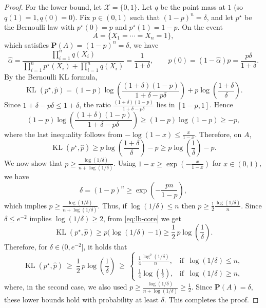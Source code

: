 \documentclass[10pt,a4paper]{amsart}
\renewcommand{\P}{\mathbf P}
\renewcommand{\le}{\leqslant}
\renewcommand{\ge}{\geqslant}
\newcommand{\X}{\mathcal{X}}
\newcommand{\kl}{\operatorname{KL}}
\begin{document}
\begin{proof}
For the lower bound, let $\X=\{0,1\}$. Let $q$ be the point mass at $1$ (so $q(1)=1,q(0)=0$). Fix $p\in(0,1)$ such that $(1-p)^n=\delta$, and let $p^\star$ be the Bernoulli law with $p^\star(0)=p$ and $p^\star(1)=1-p$. On the event
\[
A=\{X_1=\cdots=X_n=1\},
\]
which satisfies $\P(A)=(1-p)^n=\delta$, we have
\[
\widehat\alpha=\frac{\prod_{i=1}^n q(X_i)}{\prod_{i=1}^n p^\star(X_i)+\prod_{i=1}^n q(X_i)}=\frac{1}{1+\delta},
\qquad
\widehat p(0)=(1-\widehat\alpha)p=\frac{p\delta}{1+\delta}.
\]
By the Bernoulli KL formula,
\[
\kl(p^\star,\widehat p)
=(1-p)\log\left(\frac{(1+\delta)(1-p)}{1+\delta-p\delta}\right)
+p\log\left(\frac{1+\delta}{\delta}\right).
\]
Since $1+\delta-p\delta\le 1+\delta$, the ratio $\frac{(1+\delta)(1-p)}{1+\delta-p\delta}$ lies in $[1-p,1]$. Hence
\[
(1-p)\log\left(\frac{(1+\delta)(1-p)}{1+\delta-p\delta}\right)\ge (1-p)\log(1-p)\ge -p,
\]
where the last inequality follows from $-\log(1-x)\le \frac{x}{1-x}$. Therefore, on $A$,
\begin{equation}
\label{eq:lb-core}
\kl(p^\star,\widehat p)\ge p\log\left(\frac{1+\delta}{\delta}\right)-p \ge p\log\left(\frac{1}{\delta}\right)-p.
\end{equation}
We now show that $p\ge \frac{\log(1/\delta)}{n+\log(1/\delta)}$.
Using $1-x\ge \exp\left(-\frac{x}{1-x}\right)$ for $x\in(0,1)$, we have
\[
\delta=(1-p)^n\ge \exp\left(-\frac{pn}{1-p}\right),
\]
which implies $p\ge \frac{\log(1/\delta)}{n+\log(1/\delta)}$.
Thus, if $\log(1/\delta)\le n$ then $p\ge \frac{1}{2}\frac{\log(1/\delta)}{n}$.
Since $\delta\le e^{-2}$ implies $\log(1/\delta)\ge 2$, from \eqref{eq:lb-core} we get
\[
\kl(p^\star,\widehat p)\ge p\bigl(\log(1/\delta)-1\bigr)\ge \frac{1}{2}\,p\log\left(\frac{1}{\delta}\right).
\]
Therefore, for $\delta\in(0,e^{-2}]$, it holds that
\[
\kl(p^\star,\widehat p)\ \ge\ \frac{1}{2}\,p\log\left(\frac{1}{\delta}\right)
\ \ge\ \begin{cases}
\displaystyle \frac{1}{4}\frac{\log^2(1/\delta)}{n}, & \text{if }\ \log(1/\delta)\le n,\\[1.2ex]
\displaystyle \frac{1}{4}\log\left(\frac{1}{\delta}\right), & \text{if }\ \log(1/\delta)\ge n,
\end{cases}
\]
where, in the second case, we also used $p\ge \frac{\log(1/\delta)}{n+\log(1/\delta)}\ge \frac{1}{2}$. Since $\P(A)=\delta$, these lower bounds hold with probability at least $\delta$. This completes the proof.
\end{proof}
\end{document}
